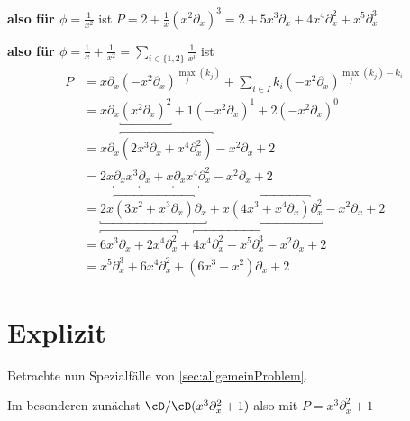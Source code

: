 \textbf{also für $\phi=\frac{1}{x^2}$} ist 
$P=2+\frac{1}{x}(x^2\partial_x)^{3}
=2+5x^3\partial_x+4x^{4}\partial_x^2+x^5\partial_x^3$
\begin{center}
\end{center}

\textbf{also für
$\phi=\frac{1}{x}+\frac{1}{x^2}=\sum_{i\in\{1,2\}}\frac{1}{x^i}$} ist 
\begin{align*}
P &=x\partial_x(-x^2\partial_x)^{\max_j(k_j)}
    +\sum_{i\in I} k_i(-x^2\partial_x)^{\max_j(k_j)-k_i}\\
  &=x\partial_x\underbracket{(x^2\partial_x)^{2}}
    +1(-x^2\partial_x)^{1}+2(-x^2\partial_x)^{0}\\
  &=x\partial_x \overbracket{(2x^3\partial_x+x^4\partial_x^2)}
    -x^2\partial_x+2\\
  &=2x\underbracket{\partial_xx^3}\partial_x
    +x\underbracket{\partial_xx^4}\partial_x^2
    -x^2\partial_x+2\\
  &=\underbracket{2x\overbracket{(3x^2+x^3\partial_x)}\partial_x}
    +\underbracket{x\overbracket{(4x^3+x^4\partial_x)}\partial_x^2}
    -x^2\partial_x+2\\
  &=\overbracket{6x^3\partial_x+2x^4\partial_x^2}
    +\overbracket{4x^4\partial_x^2+x^5\partial_x^3}
    -x^2\partial_x+2\\
  &= x^5\partial_x^3+6x^4\partial_x^2+(6x^3-x^2)\partial_x+2
\end{align*}
\begin{center}
\end{center}

\section{Explizit}
Betrachte nun Spezialfälle von \ref{sec:allgemeinProblem}.

Im besonderen zunächst $\cD/\cD(x^3\partial_x^2+1)$ also mit
$P=x^3\partial_x^2+1$

